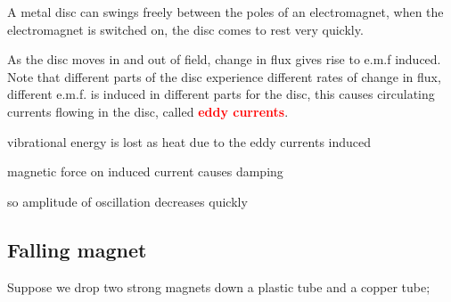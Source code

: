 \documentclass[a4paper,12pt]{book}
\newcommand{\keypoint}[1]{\textbf{\textcolor{red}{#1}}}
\newcommand{\keypoint}[1]{\textbf{\textcolor{red}{#1}}}
\begin{document}
A metal disc can swings freely between the poles of an electromagnet, when the electromagnet is switched on, the disc comes to rest very quickly.

\begin{figure}[ht]
\centering
{}

\end{figure}

As the disc moves in and out of field, change in flux gives rise to e.m.f induced. Note that different parts of the disc experience different rates of change in flux, different e.m.f. is induced in different parts for the disc, this causes circulating currents flowing in the disc, called \keypoint{eddy currents}.

\begin{compactenum}
	\item[-] vibrational energy is lost as heat due to the eddy currents induced
	
	\item[-] magnetic force on induced current causes damping
\end{compactenum}

so amplitude of oscillation decreases quickly

\subsection*{Falling magnet}

Suppose we drop two strong magnets down a plastic tube and a copper tube;
\end{document}
